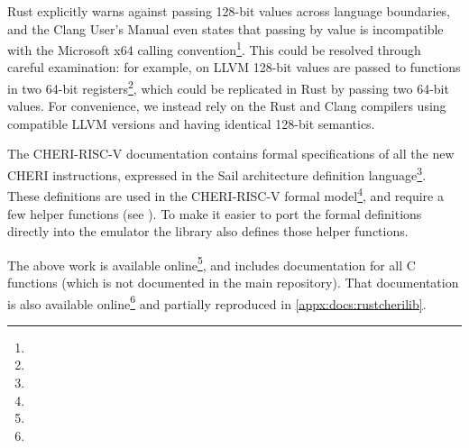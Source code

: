 Rust explicitly warns against passing 128-bit values across language boundaries, and the Clang User's Manual even states that passing  by value is incompatible with the Microsoft x64 calling convention\footnote{}.
This could be resolved through careful examination: for example, on LLVM 128-bit values are passed to functions in two 64-bit registers\footnote{}, which could be replicated in Rust by passing two 64-bit values.
For convenience, we instead rely on the Rust and Clang compilers using compatible LLVM versions and having identical 128-bit semantics.

The CHERI-RISC-V documentation contains formal specifications of all the new CHERI instructions, expressed in the Sail architecture definition  language\footnote{}.
These definitions are used in the CHERI-RISC-V formal model\footnote{}, and require a few helper functions (see \cite[Chapter 8.2]{TR-951}).
To make it easier to port the formal definitions directly into the emulator the  library also defines those helper functions.

The above work is available online\footnote{}, and includes documentation for all C functions (which is not documented in the main repository).
That documentation is also available online\footnote{} and partially reproduced in \cref{appx:docs:rustcherilib}.

